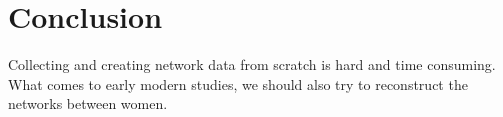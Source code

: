 \section{Conclusion}
Collecting and creating network data from scratch is hard and time consuming. 
What comes to early modern studies, we should also try to reconstruct the networks between women. 